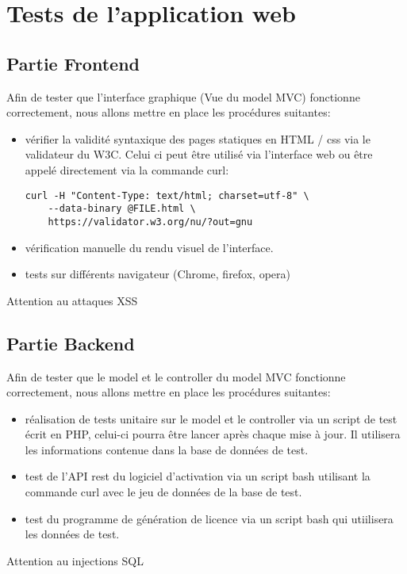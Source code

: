 \section{Tests de l'application web}

\subsection{Partie Frontend}

Afin de tester que l'interface graphique (Vue du model MVC) fonctionne correctement, nous allons mettre en place les procédures suitantes:
\begin{itemize}

    \item vérifier la validité syntaxique des pages statiques en HTML / css via 
          le validateur du W3C. Celui ci peut être utilisé via l'interface web ou  
          être appelé directement via la commande curl:
          \begin{verbatim}
curl -H "Content-Type: text/html; charset=utf-8" \
    --data-binary @FILE.html \
    https://validator.w3.org/nu/?out=gnu
          \end{verbatim}
              
    \item vérification manuelle du rendu visuel de l'interface.
    \item tests sur différents navigateur (Chrome, firefox, opera)
            
\end{itemize}
Attention au attaques XSS

\subsection{Partie Backend}

Afin de tester que le model et le controller du model MVC fonctionne correctement, 
nous allons mettre en place les procédures suitantes:
\begin{itemize}
    
    \item réalisation de tests unitaire sur le model et le controller via 
          un script de test écrit en PHP, celui-ci pourra être lancer après 
          chaque mise à jour. Il utilisera les informations contenue dans la  
          base de données de test.
        
    \item test de l'API rest du logiciel d'activation via un script bash 
          utilisant la commande curl avec le jeu de données de la base de test.
        
    \item test du programme de génération de licence via un script bash qui
          utiilisera les données de test.
\end{itemize}
Attention au injections SQL


